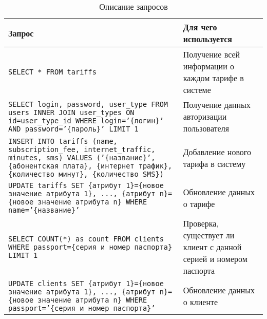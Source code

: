 \renewcommand{\arraystretch}{1.5}
\begin{xltabular}[h]{\textwidth}{|p{0.7 \textwidth}|X|}
    \caption{Описание запросов} \\
    \hline
    \textbf{Запрос}                                                                                                                                                                                                       & \textbf{Для чего используется}                                                  \\
    \hline \endhead
    \texttt{SELECT * FROM tariffs}                                                                                                                                                                                        & Получение всей информации о каждом тарифе в системе                             \\ \hline
    \texttt{SELECT login, password, user\_type FROM users INNER JOIN user\_types ON id=user\_type\_id WHERE login='\{логин\}' AND password='\{пароль\}' LIMIT 1}                                                          & Получение данных авторизации пользователя                                       \\ \hline
    \texttt{INSERT INTO tariffs (name, subscription\_fee, internet\_traffic, minutes, sms) VALUES ('\{название\}', \{абонентская плата\}, \{интернет трафик\}, \{количество минут\}, \{количество SMS\})}                 & Добавление нового тарифа в систему                                              \\ \hline
    \texttt{UPDATE tariffs SET \{атрибут 1\}=\{новое значение атрибута 1\}, ..., \{атрибут n\}=\{новое значение атрибута n\} WHERE name='\{название\}'}                                                                   & Обновление данных о тарифе                                                      \\ \hline
    \texttt{SELECT COUNT(*) as count FROM clients WHERE passport=\{серия и номер паспорта\} LIMIT 1}                                                                                                                      & Проверка, существует ли клиент с данной серией и номером паспорта               \\ \hline
    \texttt{UPDATE clients SET \{атрибут 1\}=\{новое значение атрибута 1\}, ..., \{атрибут n\}=\{новое значение атрибута n\} WHERE passport='\{серия и номер паспорта\}'}                                                 & Обновление данных о клиенте                                                     \\ \hline

\end{xltabular}

